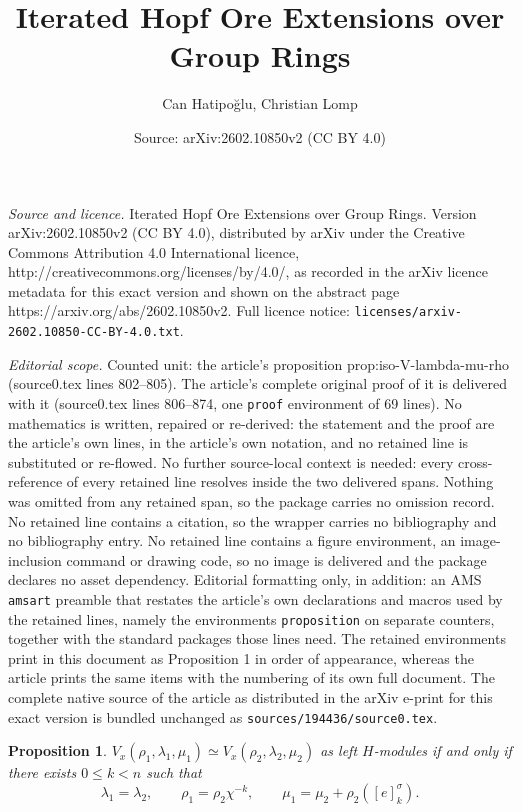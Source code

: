 \documentclass[10pt,a4paper]{amsart}
\title{Iterated Hopf Ore Extensions over Group Rings}
\author{Can Hatipo\u{g}lu, Christian Lomp}
\date{Source: arXiv:2602.10850v2 (CC BY 4.0)}
\newtheorem{proposition}{Proposition}
\newcommand{\wind}[2]{[#1]_{#2}^{\sigma}}
\begin{document}
\maketitle

\noindent\emph{Source and licence.} Iterated Hopf Ore Extensions over Group Rings. Version arXiv:2602.10850v2 (CC BY 4.0), distributed by arXiv under the Creative Commons Attribution 4.0 International licence, http://creativecommons.org/licenses/by/4.0/, as recorded in the arXiv licence metadata for this exact version and shown on the abstract page https://arxiv.org/abs/2602.10850v2. Full licence notice: \texttt{licenses/arxiv-2602.10850-CC-BY-4.0.txt}.\par\smallskip

\noindent\textit{Editorial scope.} Counted unit: the article's proposition prop:iso-V-lambda-mu-rho (source0.tex lines 802--805). The article's complete original proof of it is delivered with it (source0.tex lines 806--874, one \texttt{proof} environment of 69 lines). No mathematics is written, repaired or re-derived: the statement and the proof are the article's own lines, in the article's own notation, and no retained line is substituted or re-flowed.  No further source-local context is needed: every cross-reference of every retained line resolves inside the two delivered spans.  Nothing was omitted from any retained span, so the package carries no omission record.  No retained line contains a citation, so the wrapper carries no bibliography and no bibliography entry.  No retained line contains a figure environment, an image-inclusion command or drawing code, so no image is delivered and the package declares no asset dependency.  Editorial formatting only, in addition: an AMS \texttt{amsart} preamble that restates the article's own declarations and macros used by the retained lines, namely the environments \texttt{proposition} on separate counters, together with the standard packages those lines need.  The retained environments print in this document as Proposition 1 in order of appearance, whereas the article prints the same items with the numbering of its own full document.  The complete native source of the article as distributed in the arXiv e-print for this exact version is bundled unchanged as \texttt{sources/194436/source0.tex}.
\begin{proposition}\label{prop:iso-V-lambda-mu-rho}
$V_x(\rho_1, \lambda_1,\mu_1) \simeq V_x (\rho_2, \lambda_2,\mu_2)$ as left $H$-modules if and only if there exists $0\leq k <n$ such that 
    $$\lambda_1=\lambda_2, \qquad \rho_1=\rho_2\chi^{-k},  \qquad \mu_1 = \mu_2 + \rho_2(\wind{e}{k}).$$
\end{proposition}
\end{document}
